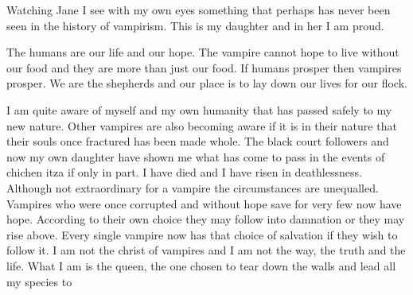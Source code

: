 Watching Jane I see with my own eyes something that perhaps has never been seen in the history of vampirism. This is my daughter and in her I am proud.

The humans are our life and our hope. The vampire cannot hope to live without our food and they are more than just our food. If humans prosper then vampires prosper. We are the shepherds and our place is to lay down our lives for our flock. 

I am quite aware of myself and my own humanity that has passed safely to my new nature. Other vampires are also becoming aware if it is in their nature that their souls once fractured has been made whole. The black court followers and now my own daughter have shown me what has come to pass in the events of chichen itza if only in part. I have died and I have risen in deathlessness. Although not extraordinary for a vampire the circumstances are unequalled. Vampires who were once corrupted and without hope save for very few now have hope. According to their own choice they may follow into damnation or they may rise above. Every single vampire now has that choice of salvation if they wish to follow it. I am not the christ of vampires and I am not the way, the truth and the life. What I am is the queen, the one chosen to tear down the walls and lead all my species to 
